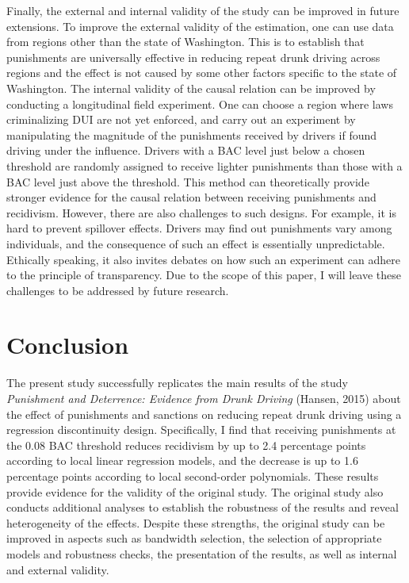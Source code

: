 \documentclass[
  11pt,
]{article}
\begin{document}
Finally, the external and internal validity of the study can be improved
in future extensions. To improve the external validity of the
estimation, one can use data from regions other than the state of
Washington. This is to establish that punishments are universally
effective in reducing repeat drunk driving across regions and the effect
is not caused by some other factors specific to the state of Washington.
The internal validity of the causal relation can be improved by
conducting a longitudinal field experiment. One can choose a region
where laws criminalizing DUI are not yet enforced, and carry out an
experiment by manipulating the magnitude of the punishments received by
drivers if found driving under the influence. Drivers with a BAC level
just below a chosen threshold are randomly assigned to receive lighter
punishments than those with a BAC level just above the threshold. This
method can theoretically provide stronger evidence for the causal
relation between receiving punishments and recidivism. However, there
are also challenges to such designs. For example, it is hard to prevent
spillover effects. Drivers may find out punishments vary among
individuals, and the consequence of such an effect is essentially
unpredictable. Ethically speaking, it also invites debates on how such
an experiment can adhere to the principle of transparency. Due to the
scope of this paper, I will leave these challenges to be addressed by
future research.

\hypertarget{conclusion}{%
\section{Conclusion}\label{conclusion}}

The present study successfully replicates the main results of the study
\emph{Punishment and Deterrence: Evidence from Drunk Driving} (Hansen,
2015) about the effect of punishments and sanctions on reducing repeat
drunk driving using a regression discontinuity design. Specifically, I
find that receiving punishments at the 0.08 BAC threshold reduces
recidivism by up to 2.4 percentage points according to local linear
regression models, and the decrease is up to 1.6 percentage points
according to local second-order polynomials. These results provide
evidence for the validity of the original study. The original study also
conducts additional analyses to establish the robustness of the results
and reveal heterogeneity of the effects. Despite these strengths, the
original study can be improved in aspects such as bandwidth selection,
the selection of appropriate models and robustness checks, the
presentation of the results, as well as internal and external validity.
\end{document}
